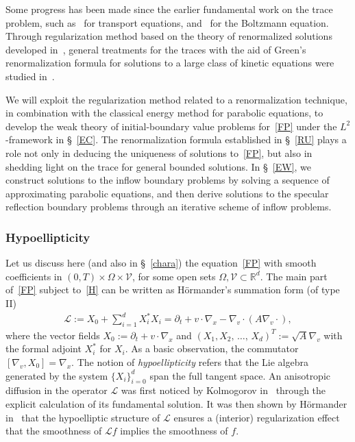 \documentclass[10pt]{amsart}
\theoremstyle{definition}\newtheorem{defi}[theo]{Definition}\newtheorem{rema}[theo]{Remark}\newtheorem{exam}[theo]{Example}\newtheorem{exem}[theo]{Example}\newtheorem{nota}[theo]{Notation}
\newcommand*\p{\partial}
\newcommand*\R {\mathbb{R}}
\newcommand*\V {\mathcal{V}}
\newcommand{\scL}{\mathscr{L}}
\begin{document}
Some progress has been made since the earlier fundamental work on the trace problem, such as~\cite{Bardos,Cessenat2} for transport equations, and~\cite{Ham} for the Boltzmann equation. Through regularization method based on the theory of renormalized solutions developed in~\cite{DPLode}, general treatments for the traces with the aid of Green's renormalization formula for solutions to a large class of kinetic equations were studied in~\cite{Mischler1,Mischler3}.

We will exploit the regularization method related to a renormalization technique, in combination with the classical energy method for parabolic equations, to develop the weak theory of initial-boundary value problems for~\eqref{FP} under the $L^2$-framework in \S~\ref{EC}. The renormalization formula established in \S~\ref{RU} plays a role not only in deducing the uniqueness of solutions to~\eqref{FP}, but also in shedding light on the trace for general bounded solutions. In \S~\ref{EW}, we construct solutions to the inflow boundary problems by solving a sequence of approximating parabolic equations, and then derive solutions to the specular reflection boundary problems through an iterative scheme of inflow problems.

\subsubsection{Hypoellipticity}

Let us discuss here (and also in \S~\ref{chara}) the equation~\eqref{FP} with smooth coefficients in $(0,T)\times\Omega\times\V$, for some open sets $\Omega,\V\subset\R^d$. The main part of~\eqref{FP} subject to~\eqref{H} can be written as H\"ormander's summation form (of type II)
\begin{align*}
\scL:=X_0+\sum\nolimits_{i=1}^d X_i^*X_i=\partial_t+v\cdot\nabla_x-\nabla_v\cdot(A\nabla_v\cdot),
\end{align*}
where the vector fields $X_0:=\p_t+v\cdot\nabla_x$ and $(X_1,X_2,\,\dots,\,X_d)^T:=\sqrt{A}\nabla_v$ with the formal adjoint $X_i^*$ for $X_i$. As a basic observation, the commutator $[\nabla_v,X_0]=\nabla_x$. The notion of \emph{hypoellipticity} refers that the Lie algebra generated by the system $\{X_i\}_{i=0}^d$ span the full tangent space. An anisotropic diffusion in the operator $\scL$ was first noticed by Kolmogorov in~\cite{Kol} through the explicit calculation of its fundamental solution. It was then shown by H\"ormander in~\cite{Ho} that the hypoelliptic structure of $\scL$ ensures a (interior) regularization effect that the smoothness of $\scL f$ implies the smoothness of $f$.
\end{document}
